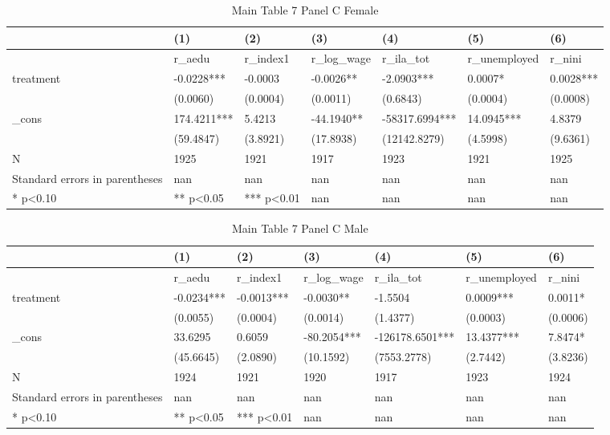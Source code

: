 \documentclass[11pt]{article}
\begin{document}
\clearpage
\begin{table}[!htbp]
\centering
\caption{Main Table 7 Panel C Female}
\label{tab:table7c_f}
\begin{tabular}{lllllll}
\toprule
 & (1) & (2) & (3) & (4) & (5) & (6) \\
\midrule
 & r\_aedu & r\_index1 & r\_log\_wage & r\_ila\_tot & r\_unemployed & r\_nini \\
treatment & -0.0228*** & -0.0003 & -0.0026** & -2.0903*** & 0.0007* & 0.0028*** \\
 & (0.0060) & (0.0004) & (0.0011) & (0.6843) & (0.0004) & (0.0008) \\
\_cons & 174.4211*** & 5.4213 & -44.1940** & -58317.6994*** & 14.0945*** & 4.8379 \\
 & (59.4847) & (3.8921) & (17.8938) & (12142.8279) & (4.5998) & (9.6361) \\
N & 1925 & 1921 & 1917 & 1923 & 1921 & 1925 \\
Standard errors in parentheses & nan & nan & nan & nan & nan & nan \\
* p<0.10 & ** p<0.05 & *** p<0.01 & nan & nan & nan & nan \\
\bottomrule
\end{tabular}

\end{table}

\clearpage
\begin{table}[!htbp]
\centering
\caption{Main Table 7 Panel C Male}
\label{tab:table7c_m}
\begin{tabular}{lllllll}
\toprule
 & (1) & (2) & (3) & (4) & (5) & (6) \\
\midrule
 & r\_aedu & r\_index1 & r\_log\_wage & r\_ila\_tot & r\_unemployed & r\_nini \\
treatment & -0.0234*** & -0.0013*** & -0.0030** & -1.5504 & 0.0009*** & 0.0011* \\
 & (0.0055) & (0.0004) & (0.0014) & (1.4377) & (0.0003) & (0.0006) \\
\_cons & 33.6295 & 0.6059 & -80.2054*** & -126178.6501*** & 13.4377*** & 7.8474* \\
 & (45.6645) & (2.0890) & (10.1592) & (7553.2778) & (2.7442) & (3.8236) \\
N & 1924 & 1921 & 1920 & 1917 & 1923 & 1924 \\
Standard errors in parentheses & nan & nan & nan & nan & nan & nan \\
* p<0.10 & ** p<0.05 & *** p<0.01 & nan & nan & nan & nan \\
\bottomrule
\end{tabular}

\end{table}
\end{document}
